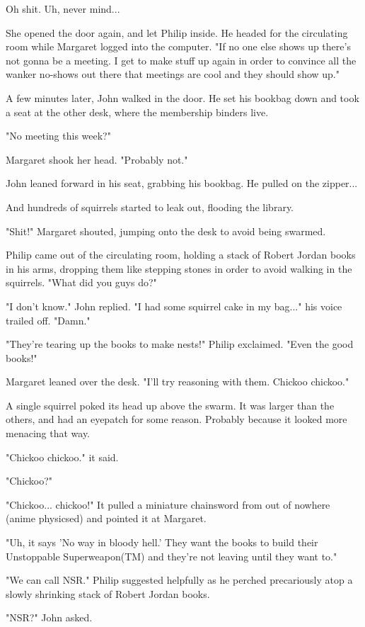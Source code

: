 \documentclass[10pt]{article}
\begin{document}
Oh shit. Uh, never mind...

She opened the door again, and let Philip inside. He headed for the circulating room while Margaret logged into the computer. "If no one else shows up there's not gonna be a meeting. I get to make stuff up again in order to convince all the wanker no-shows out there that meetings are cool and they should show up."

A few minutes later, John walked in the door. He set his bookbag down and took a seat at the other desk, where the membership binders live.

"No meeting this week?"

Margaret shook her head. "Probably not."

John leaned forward in his seat, grabbing his bookbag. He pulled on the zipper...

And hundreds of squirrels started to leak out, flooding the library.

"Shit!" Margaret shouted, jumping onto the desk to avoid being swarmed.

Philip came out of the circulating room, holding a stack of Robert Jordan books in his arms, dropping them like stepping stones in order to avoid walking in the squirrels. "What did you guys do?"

"I don't know." John replied. "I had some squirrel cake in my bag..." his voice trailed off. "Damn."

"They're tearing up the books to make nests!" Philip exclaimed. "Even the good books!"

Margaret leaned over the desk. "I'll try reasoning with them. Chickoo chickoo."

A single squirrel poked its head up above the swarm. It was larger than the others, and had an eyepatch for some reason. Probably because it looked more menacing that way.

"Chickoo chickoo." it said.

"Chickoo?"

"Chickoo... chickoo!" It pulled a miniature chainsword from out of nowhere (anime physicsed) and pointed it at Margaret.

"Uh, it says 'No way in bloody hell.' They want the books to build their Unstoppable Superweapon(TM) and they're not leaving until they want to."

"We can call NSR." Philip suggested helpfully as he perched precariously atop a slowly shrinking stack of Robert Jordan books.

"NSR?" John asked.
\end{document}
